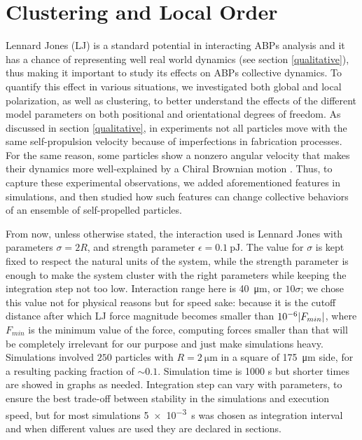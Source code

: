 \documentclass[../../master_thesis_np.tex]{subfiles}
\begin{document}
		\section{Clustering and Local Order}
		Lennard Jones (LJ) is a standard potential in interacting ABPs analysis and it has a chance of representing well real world dynamics (see section \ref{qualitative}), thus making it important to study its effects on ABPs collective dynamics. 
		To quantify this effect in various situations, we investigated both global and local polarization, as well as clustering, to better understand the effects of the different model parameters on both positional and orientational degrees of freedom.
		As discussed in section \ref{qualitative}, in experiments not all particles move with the same self-propulsion velocity because of imperfections in fabrication processes.
		For the same reason, some particles show a nonzero angular velocity that makes their dynamics more well-explained by a Chiral Brownian motion \cite{callegari_numerical_2019}.
		Thus, to capture these experimental observations, we added aforementioned features in simulations, and then studied how such features can change collective behaviors of an ensemble of self-propelled particles.
		
		From now, unless otherwise stated, the interaction used is Lennard Jones with parameters $\sigma = 2R$, and strength parameter $\epsilon  = \SI{0.1}{\pico\joule}$.
		The value for $\sigma$ is kept fixed to respect the natural units of the system, while the strength parameter is enough to make the system cluster with the right parameters while keeping the integration step not too low.
		Interaction range here is \SI{40}{\um}, or $10\sigma$; we chose this value not for physical reasons but for speed sake: because it is the cutoff distance after which LJ force magnitude becomes smaller than $10^{-6}\abs{F_{min}}$, where $F_{min}$ is the minimum value of the force, computing forces smaller than that will be completely irrelevant for our purpose and just make simulations heavy.
		Simulations involved $250$ particles with $R = \SI{2}{\um}$ in a square of \SI{175}{\um} side, for a resulting packing fraction of $\sim 0.1$.
		Simulation time is 1000 s but shorter times are showed in graphs as needed.
		Integration step can vary with parameters, to ensure the best trade-off between stability in the simulations and execution speed, but for most simulations \SI{5e-3}{\second} was chosen as integration interval and when different values are used they are declared in sections.
		
\end{document}
